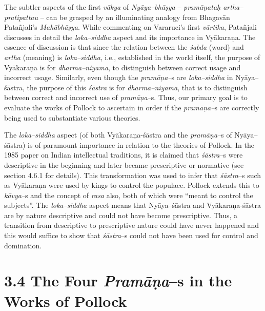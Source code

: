 The subtler aspects of the first \textit{vākya} of \textit{Nyāya–bhāṣya }– \textit{pramāṇataḥ artha–pratipattau} – can be grasped by an illuminating analogy from Bhagavān Patañjali’s \textit{Mahābhāṣya}. While commenting on Vararuci's first \textit{vārtika}, Patañjali discusses in detail the \textit{loka–siddha} aspect and its importance in Vyākaraṇa. The essence of discussion is that since the relation between the \textit{śabda} (word) and \textit{artha} (meaning) is \textit{loka–siddha}, i.e., established in the world itself, the purpose of Vyākaraṇa is for \textit{dharma–niyama}, to distinguish between correct usage and incorrect usage. Similarly, even though the \textit{pramāṇa–}s are \textit{loka–siddha} in Nyāya–śāstra, the purpose of this \textit{śāstra} is for \textit{dharma–niyama}, that is to distinguish between correct and incorrect use of \textit{pramāṇa–}s. Thus, our primary goal is to evaluate the works of Pollock to ascertain in order if the \textit{pramāṇa–}s are correctly being used to substantiate various theories.

The \textit{loka–siddha} aspect (of both Vyākaraṇa-śāstra and the \textit{pramāṇa–}s of Nyāya–śāstra) is of paramount importance in relation to the theories of Pollock. In the 1985 paper on Indian intellectual traditions, it is claimed that \textit{śāstra}–s were descriptive in the beginning and later became prescriptive or normative (see section 4.6.1 for details). This transformation was used to infer that \textit{śāstra}–s such as Vyākaraṇa were used by kings to control the populace. Pollock extends this to \textit{kāvya}–s and the concept of \textit{rasa} also, both of which were “meant to control the subjects”. The \textit{loka–siddha }aspect means that Nyāya–śāstra and Vyākaraṇa-śāstra are by nature descriptive and could not have become prescriptive. Thus, a transition from descriptive to prescriptive nature could have never happened and this would suffice to show that \textit{śāstra}–s could not have been used for control and domination.

\vspace{-.5cm}

\section*{3.4 The Four \textit{Pramāṇa}–s in the Works of Pollock}

